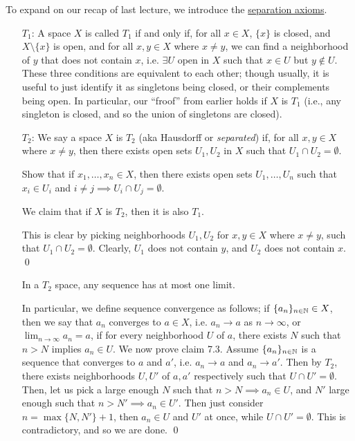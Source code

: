 \noindent To expand on our recap of last lecture, we introduce the \href{https://en.wikipedia.org/wiki/Separation_axiom}{separation axioms}.
\begin{itemize}
    \item[$T_1$:] A space $X$ is called $T_1$ if and only if, for all $x \in X$, $\{x\}$ is closed, and $X \setminus \{x\}$ is open, and for all $x, y \in X$ where $x \neq y$, we can find a neighborhood of $y$ that does not contain $x$, i.e. $\exists U$ open in $X$ such that $x \in U$ but $y \not\in U$. These three conditions are equivalent to each other; though usually, it is useful to just identify it as singletons being closed, or their complements being open.
    \medskip\newline
    In particular, our ``froof'' from earlier holds if $X$ is $T_1$ (i.e., any singleton is closed, and so the union of singletons are closed).
    \item[$T_2$:] We say a space $X$ is $T_2$ (aka Hausdorff or \textit{separated}) if, for all $x, y \in X$ where $x \neq y$, then there exists open sets $U_1, U_2$ in $X$ such that $U_1 \cap U_2 = \emptyset$.
    \begin{exercise}
        Show that if $x_1, \dots, x_n \in X$, then there exists open sets $U_1, \dots, U_n$ such that $x_i \in U_i$ and $i \neq j \implies U_i \cap U_j = \emptyset$.
    \end{exercise}
    \begin{simpleclaim}
        We claim that if $X$ is $T_2$, then it is also $T_1$.
    \end{simpleclaim}
    This is clear by picking neighborhoods $U_1, U_2$ for $x, y \in X$ where $x \neq y$, such that $U_1 \cap U_2 = \emptyset$. Clearly, $U_1$ does not contain $y$, and $U_2$ does not contain $x$. \qed
    \begin{simpleclaim}
        In a $T_2$ space, any sequence has at most one limit.
    \end{simpleclaim}
    \noindent In particular, we define sequence convergence as follows; if $\{a_n\}_{n \in \mathbb N} \in X$, then we say that $a_n$ converges to $a \in X$, i.e. $a_n \to a$ as $n \to \infty$, or $\lim_{n \to \infty} a_n = a$, if for every neighborhood $U$ of $a$, there exists $N$ such that $n > N$ implies $a_n \in U$.
    \medskip\newline
    We now prove claim 7.3. Assume $\{a_n\}_{n \in \mathbb N}$ is a sequence that converges to $a$ and $a'$, i.e. $a_n \to a$ and $a_n \to a'$. Then by $T_2$, there exists neighborhoods $U, U'$ of $a, a'$ respectively such that $U \cap U' = \emptyset$. Then, let us pick a large enough $N$ such that $n > N \implies a_n \in U$, and $N'$ large enough such that $n > N' \implies a_n \in U'$. Then just consider $n = \max\{N, N'\} + 1$, then $a_n \in U$ and $U'$ at once, while $U \cap U' = \emptyset$. This is contradictory, and so we are done. \qed
\end{itemize}

